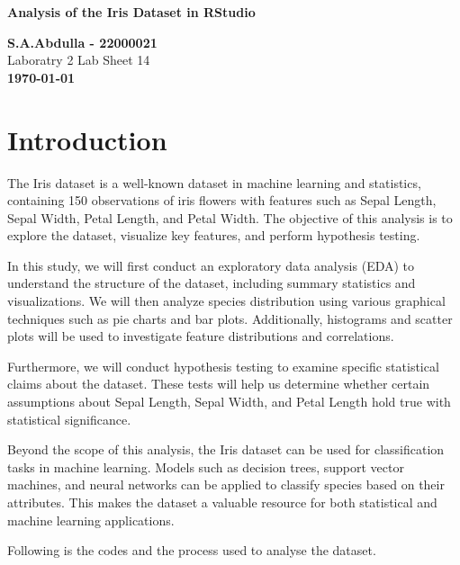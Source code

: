 \documentclass[a4paper,12pt]{article}
\begin{document}
\begin{titlepage}
    \centering
    \vspace*{1cm}
    
    \Huge\textbf{Analysis of the Iris Dataset in RStudio}
    
    \vspace{1.5cm}
    \Large \textbf{S.A.Abdulla - 22000021} \\ 
    Laboratry 2 Lab Sheet 14 
    \vspace{1.5cm} \\ 
    \large \textbf{\today}

\end{titlepage}

\tableofcontents
\newpage

\section{Introduction}

The Iris dataset is a well-known dataset in machine learning and statistics, containing 150 observations of iris flowers with features such as Sepal Length, Sepal Width, Petal Length, and Petal Width. The objective of this analysis is to explore the dataset, visualize key features, and perform hypothesis testing.

In this study, we will first conduct an exploratory data analysis (EDA) to understand the structure of the dataset, including summary statistics and visualizations. We will then analyze species distribution using various graphical techniques such as pie charts and bar plots. Additionally, histograms and scatter plots will be used to investigate feature distributions and correlations.

Furthermore, we will conduct hypothesis testing to examine specific statistical claims about the dataset. These tests will help us determine whether certain assumptions about Sepal Length, Sepal Width, and Petal Length hold true with statistical significance.

Beyond the scope of this analysis, the Iris dataset can be used for classification tasks in machine learning. Models such as decision trees, support vector machines, and neural networks can be applied to classify species based on their attributes. This makes the dataset a valuable resource for both statistical and machine learning applications.

Following is the codes and the process used to analyse the dataset.
\end{document}
